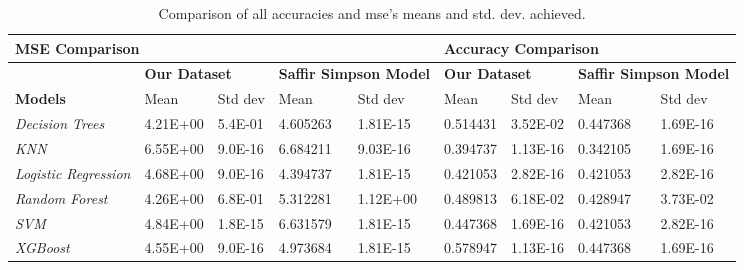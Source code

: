 \documentclass[letterpaper, 10 pt, conference]{ieeeconf}  %
\begin{document}
\begin{table}[t]
\caption{Comparison of all accuracies and mse's means and std. dev. achieved.}
\centering
\begin{tabular}{|l|l|l|l|l|l|l|l|l|}
\hline
\multicolumn{5}{|l|}{\textbf{MSE Comparison}}                                                                                 & \multicolumn{4}{l|}{\textbf{Accuracy Comparison}}                                              \\ \hline
\textbf{}                    & \multicolumn{2}{l|}{\textbf{Our Dataset}} & \multicolumn{2}{l|}{\textbf{Saffir Simpson Model}} & \multicolumn{2}{l|}{\textbf{Our Dataset}} & \multicolumn{2}{l|}{\textbf{Saffir Simpson Model}} \\ \hline
\textbf{Models}              & Mean                 & Std dev            & Mean                     & Std dev                 & Mean                & Std dev             & Mean                     & Std dev                 \\ \hline
\textit{Decision Trees}      & 4.21E+00             & 5.4E-01            & 4.605263                 & 1.81E-15                & 0.514431            & 3.52E-02            & 0.447368                 & 1.69E-16                \\ \hline
\textit{KNN}                 & 6.55E+00             & 9.0E-16            & 6.684211                 & 9.03E-16                & 0.394737            & 1.13E-16            & 0.342105                 & 1.69E-16                \\ \hline
\textit{Logistic Regression} & 4.68E+00             & 9.0E-16            & 4.394737                 & 1.81E-15                & 0.421053            & 2.82E-16            & 0.421053                 & 2.82E-16                \\ \hline
\textit{Random Forest}       & 4.26E+00             & 6.8E-01            & 5.312281                 & 1.12E+00                & 0.489813            & 6.18E-02            & 0.428947                 & 3.73E-02                \\ \hline
\textit{SVM}                 & 4.84E+00             & 1.8E-15            & 6.631579                 & 1.81E-15                & 0.447368            & 1.69E-16            & 0.421053                 & 2.82E-16                \\ \hline
\textit{XGBoost}             & 4.55E+00             & 9.0E-16            & 4.973684                 & 1.81E-15                & 0.578947            & 1.13E-16            & 0.447368                 & 1.69E-16                \\ \hline
\end{tabular}
\label{table:accvsmse}
\end{table}
\end{document}
